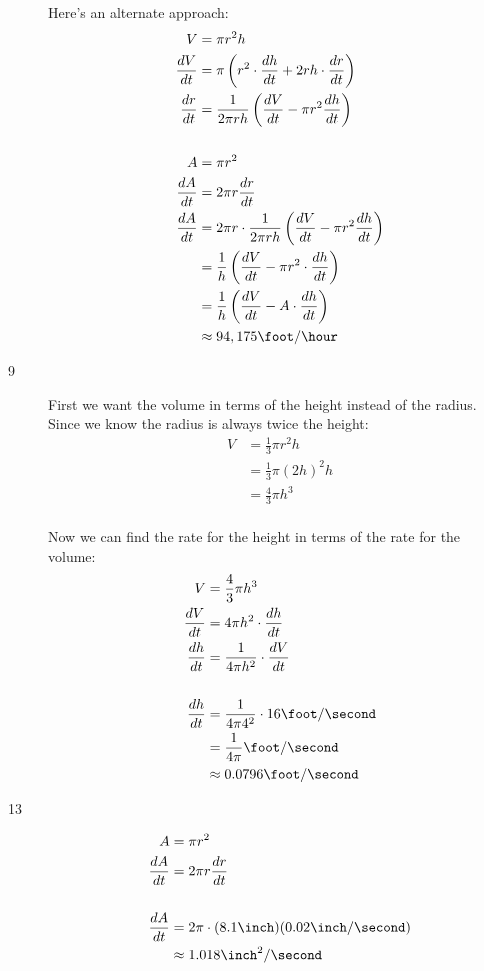 \documentclass[fleqn]{exam}
\begin{document}
\begin{description}
Here's an alternate approach:
\begin{align*}
  V &= \pi r^2 h \\
  \frac{dV}{dt} &= \pi \left( r^2 \cdot \frac{dh}{dt} + 2rh \cdot \frac{dr}{dt} \right) \\ 
  \frac{dr}{dt} &= \frac{1}{2 \pi r h} \left( \frac{dV}{dt} - \pi r^2 \frac{dh}{dt} \right) \\
  \\
  A &= \pi r^2 \\
  \frac{dA}{dt} &= 2 \pi r \frac{dr}{dt} \\
  \frac{dA}{dt} &= 2 \pi r \cdot \frac{1}{2 \pi r h} \left( \frac{dV}{dt} - \pi r^2 \frac{dh}{dt} \right) \\
                &= \frac{1}{h} \left( \frac{dV}{dt} - \pi r^2 \cdot \frac{dh}{dt} \right) \\
                &= \frac{1}{h} \left( \frac{dV}{dt} - A \cdot \frac{dh}{dt} \right) \\
                &\approx 94,175 \foot / \hour \\
\end{align*}


\item[9]
First we want the volume in terms of the height instead of the radius.  Since we know the radius is always twice the height:
\begin{align*}
  V &= \frac{1}{3} \pi r^2 h \\
   &= \frac{1}{3} \pi (2h)^2 h \\
   &= \frac{4}{3} \pi h^3 \\
\end{align*}

Now we can find the rate for the height in terms of the rate for the volume:
\begin{align*}
  V &= \frac{4}{3} \pi h^3 \\
  \frac{dV}{dt} &= 4 \pi h^2 \cdot \frac{dh}{dt}\\
  \frac{dh}{dt} &= \frac{1}{4 \pi h^2} \cdot \frac{dV}{dt}\\
  \\
  \frac{dh}{dt} &= \frac{1}{4 \pi 4^2} \cdot 16 \foot / \second \\
  &= \frac{1}{4 \pi} \foot / \second \\
  &\approx 0.0796 \foot / \second \\
\end{align*}


\item[13]
\begin{align*}
  A &= \pi r^2 \\
  \frac{dA}{dt} &= 2 \pi r \frac{dr}{dt} \\
  \\
  \frac{dA}{dt} &= 2 \pi \cdot (8.1 \inch) (0.02 \inch / \second) \\
  &\approx 1.018 \inch^2 / \second \\
\end{align*}


\end{description}
\end{document}
